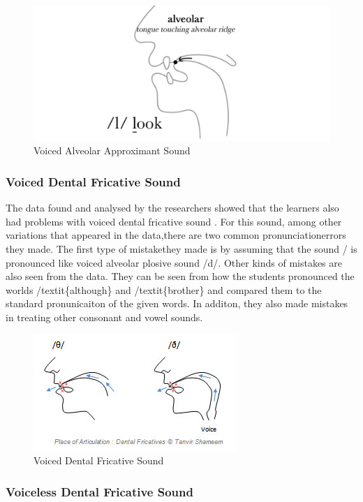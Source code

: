 \begin{figure}[h!]
	\centering
	\includegraphics[scale=0.25]{img/lateral-approximant-mouth-position.png}
	\caption{Voiced Alveolar Approximant Sound}
	\label{fig:world}
\end{figure}

\subsubsection{Voiced Dental Fricative
Sound}

The data found and analysed by the researchers showed that the learners
also had problems with voiced dental fricative sound \dh. For this
sound, among other variations that appeared in the data,there are two
common pronunciationerrors they made. The first type of mistakethey made
is by assuming that the sound \dh/ is pronounced like voiced alveolar
plosive sound /d/. Other kinds of mistakes are also seen from the data.
They can be seen from how the students pronounced the worlds
/textit\{although\} and /textit\{brother\} and compared them to the
standard pronunicaiton of the given words. In additon, they also made
mistakes in treating other consonant and vowel sounds.

\begin{figure}[h!]
	\centering
	\includegraphics[scale=0.35]{img/dental.jpg}
	\caption{Voiced Dental Fricative Sound}
	\label{fig:world}
\end{figure}

\subsubsection{Voiceless Dental Fricative
Sound}

